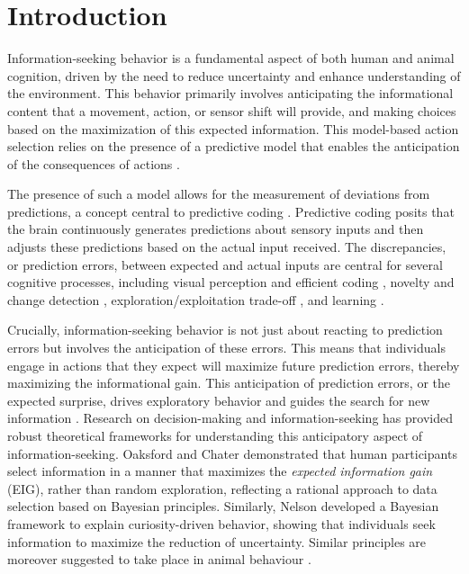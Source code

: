 \documentclass[10pt,letterpaper]{article}
\begin{document}

\section{Introduction}

Information-seeking behavior is a fundamental aspect of both human and animal cognition, driven by the need to reduce uncertainty and enhance understanding of the environment. This behavior primarily involves anticipating the informational content that a movement, action, or sensor shift will provide, and making choices based on the maximization of this expected information. This model-based action selection relies on the presence of a predictive model that enables the anticipation of the consequences of actions \cite{friston2010free}.

The presence of such a model allows for the measurement of deviations from predictions, a concept central to predictive coding \cite{rao1999predictive}. Predictive coding posits that the brain continuously generates predictions about sensory inputs and then adjusts these predictions based on the actual input received. The discrepancies, or prediction errors, between expected and actual inputs are central for several cognitive processes, including visual perception and efficient coding \cite{rao1999predictive,ITTI20091295}, novelty and change detection \cite{behrens2007learning, summerfield2009expectation,garrido2013outlier}, exploration/exploitation trade-off \cite{cohen2007should,wilson2014humans}, and learning \cite{schulz2007serious,oudeyer2016intrinsic}.

Crucially, information-seeking behavior is not just about reacting to prediction errors but involves the anticipation of these errors. This means that individuals engage in actions that they expect will maximize future prediction errors, thereby maximizing the informational gain. This anticipation of prediction errors, or the expected surprise, drives exploratory behavior and guides the search for new information \cite{friston2012perceptions}.
Research on decision-making and information-seeking has provided robust theoretical frameworks for understanding this anticipatory aspect of information-seeking. Oaksford and Chater \cite{oaksford1994rational} demonstrated that human participants select information in a manner that maximizes the \emph{expected information gain} (EIG), rather than random exploration, reflecting a rational approach to data selection based on Bayesian principles. Similarly, Nelson \cite{nelson2005finding} developed a Bayesian framework to explain curiosity-driven behavior, showing that individuals seek information to maximize the reduction of uncertainty. Similar principles are moreover suggested to take place in animal behaviour \cite{gottlieb2013information,kidd2015psychology}.
\end{document}
